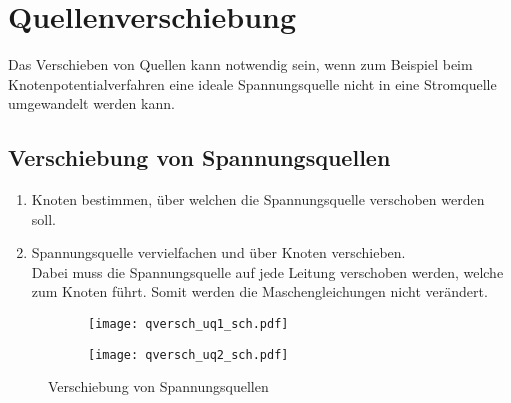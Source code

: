 



\newpage
\section{Quellenverschiebung}
Das Verschieben von Quellen kann notwendig sein, wenn zum Beispiel beim Knotenpotentialverfahren eine ideale Spannungsquelle nicht in eine Stromquelle umgewandelt werden kann. 

\subsection{Verschiebung von Spannungsquellen}
\begin{enumerate}
  \item Knoten bestimmen, über welchen die Spannungsquelle verschoben werden soll. 
  \item Spannungsquelle vervielfachen und über Knoten verschieben. \\
  Dabei muss die Spannungsquelle auf jede Leitung verschoben werden, welche zum Knoten führt. Somit werden die Maschengleichungen nicht verändert. 
\end{enumerate}
\begin{figure}[h!]
	\centering
	\begin{subfigure}[b]{0.4\textwidth}
		\centering
		\texttt{[image: qversch\_uq1\_sch.pdf]}
		\label{sch:starqversch_uq1}
	\end{subfigure}
	\begin{subfigure}[b]{0.4\textwidth}
		\centering
		\texttt{[image: qversch\_uq2\_sch.pdf]}
		\label{sch:qversch_uq2}
	\end{subfigure}
	\caption{Verschiebung von Spannungsquellen}
	\label{sch:qversch_uq1}
\end{figure}

